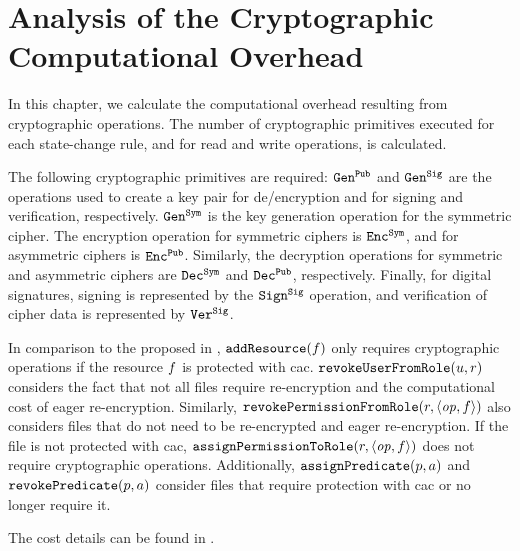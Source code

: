 \section{Analysis of the Cryptographic Computational Overhead}
\label{sec:implementation.computation}

In this chapter, we calculate the computational overhead resulting from cryptographic operations. The number of cryptographic primitives executed for each state-change rule, and for read and write operations, is calculated. 

The following cryptographic primitives are required:  \( \mathtt{Gen}^{\mathtt{Pub}}_{} \) and \( \mathtt{Gen}^{\mathtt{Sig}}_{} \) are the operations used to create a key pair for de/encryption and for signing and verification, respectively. \( \mathtt{Gen}^{\mathtt{Sym}}_{} \) is the key generation operation for the symmetric cipher. The encryption operation for symmetric ciphers is \( \mathtt{Enc}^{\mathtt{Sym}}_{} \), and for asymmetric ciphers is \( \mathtt{Enc}^{\mathtt{Pub}}_{} \). Similarly, the decryption operations for symmetric and asymmetric ciphers are \( \mathtt{Dec}^{\mathtt{Sym}}_{} \) and \( \mathtt{Dec}^{\mathtt{Pub}}_{} \), respectively. Finally, for digital signatures, signing is represented by the \( \mathtt{Sign}^{\mathtt{Sig}}_{} \) operation, and verification of cipher data is represented by \( \mathtt{Ver}^{\mathtt{Sig}}_{} \).

In comparison to the \cac proposed in \cite{cac}, \( \mathtt{addResource}(f) \) only requires cryptographic operations if the resource \( f \) is protected with \gls{cac}. \( \mathtt{revokeUserFromRole}(u, r) \) considers the fact that not all files require re-encryption and the computational cost of eager re-encryption. Similarly, \( \mathtt{revokePermissionFromRole}(r, \langle \mathit{op}, f \rangle) \) also considers files that do not need to be re-encrypted and eager re-encryption. If the file is not protected with \gls{cac}, \( \mathtt{assignPermissionToRole}(r, \langle \mathit{op}, f \rangle) \) does not require cryptographic operations. Additionally, \( \mathtt{assignPredicate}(p, a) \) and \( \mathtt{revokePredicate}(p, a) \) consider files that require protection with \gls{cac} or no longer require it.

The cost details can be found in .

